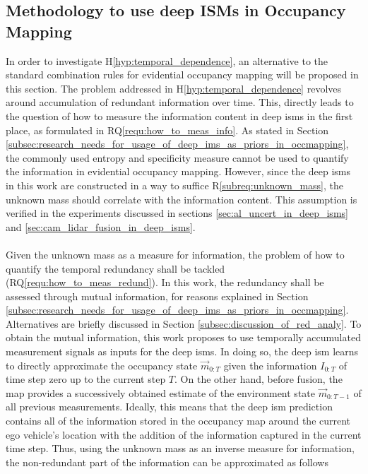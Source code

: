 \subsection{Methodology to use deep ISMs in Occupancy Mapping}
\label{subsec:method_to_use_deep_isms_in_occmaps}
In order to investigate H\ref{hyp:temporal_dependence}, an alternative to the standard combination rules for evidential occupancy mapping will be proposed in this section. The problem addressed in H\ref{hyp:temporal_dependence} revolves around accumulation of redundant information over time. This, directly leads to the question of how to measure the information content in deep \gls{ism}s in the first place, as formulated in RQ\ref{requ:how_to_meas_info}. As stated in Section \ref{subsec:research_needs_for_usage_of_deep_ims_as_priors_in_occmapping}, the commonly used entropy and specificity measure cannot be used to quantify the information in evidential occupancy mapping. However, since the deep \gls{ism}s in this work are constructed in a way to suffice R\ref{subreq:unknown_mass}, the unknown mass should correlate with the information content. This assumption is verified in the experiments discussed in sections \ref{sec:al_uncert_in_deep_isms} and \ref{sec:cam_lidar_fusion_in_deep_isms}.
\\\\
Given the unknown mass as a measure for information, the problem of how to quantify the temporal redundancy shall be tackled (RQ\ref{requ:how_to_meas_redund}). In this work, the redundancy shall be assessed through mutual information, for reasons explained in Section \ref{subsec:research_needs_for_usage_of_deep_ims_as_priors_in_occmapping}. Alternatives are briefly discussed in Section \ref{subsec:discussion_of_red_analy}. To obtain the mutual information, this work proposes to use temporally accumulated measurement signals as inputs for the deep \gls{ism}s. In doing so, the deep \gls{ism} learns to directly approximate the occupancy state $\vec{m}_{0:T}$ given the information $I_{0:T}$ of time step zero up to the current step $T$. On the other hand, before fusion, the map provides a successively obtained estimate of the environment state $\vec{m}_{0:T-1}$ of all previous measurements. Ideally, this means that the deep \gls{ism} prediction contains all of the information stored in the occupancy map around the current ego vehicle's location with the addition of the information captured in the current time step. Thus, using the unknown mass as an inverse measure for information, the non-redundant part of the information can be approximated as follows
